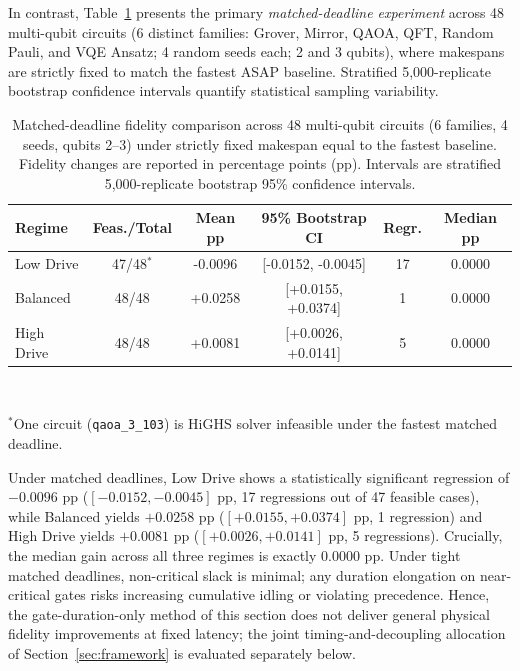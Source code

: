 \documentclass[10pt,letterpaper,journal]{IEEEtran}
\begin{document}
In contrast, Table~\ref{tab:matched_deadlines} presents the primary \emph{matched-deadline experiment} across 48 multi-qubit circuits (6 distinct families: Grover, Mirror, QAOA, QFT, Random Pauli, and VQE Ansatz; 4 random seeds each; 2 and 3 qubits), where makespans are strictly fixed to match the fastest ASAP baseline. Stratified 5,000-replicate bootstrap confidence intervals quantify statistical sampling variability.

\begin{table}[t]
\caption{Matched-deadline fidelity comparison across 48 multi-qubit circuits (6 families, 4 seeds, qubits 2--3) under strictly fixed makespan equal to the fastest baseline. Fidelity changes are reported in percentage points (pp). Intervals are stratified 5,000-replicate bootstrap 95\% confidence intervals.}\label{tab:matched_deadlines}
\centering\footnotesize\setlength{\tabcolsep}{1.8pt}
\begin{tabular}{lccccc}\toprule
Regime & Feas./Total & Mean pp & 95\% Bootstrap CI & Regr. & Median pp \\\midrule
Low Drive  & 47/48$^*$ & -0.0096 & [-0.0152, -0.0045] & 17 & 0.0000 \\
Balanced   & 48/48     & +0.0258 & [+0.0155, +0.0374] & 1  & 0.0000 \\
High Drive & 48/48     & +0.0081 & [+0.0026, +0.0141] & 5  & 0.0000 \\
\bottomrule
\end{tabular}\\[2pt]
\parbox{0.96\columnwidth}{\scriptsize $^*$One circuit (\texttt{qaoa\_3\_103}) is HiGHS solver infeasible under the fastest matched deadline.}
\end{table}

Under matched deadlines, Low Drive shows a statistically significant regression of $-0.0096$ pp ($[-0.0152, -0.0045]$ pp, 17 regressions out of 47 feasible cases), while Balanced yields $+0.0258$ pp ($[+0.0155, +0.0374]$ pp, 1 regression) and High Drive yields $+0.0081$ pp ($[+0.0026, +0.0141]$ pp, 5 regressions). Crucially, the median gain across all three regimes is exactly $0.0000$ pp. Under tight matched deadlines, non-critical slack is minimal; any duration elongation on near-critical gates risks increasing cumulative idling or violating precedence. Hence, the gate-duration-only method of this section does not deliver general physical fidelity improvements at fixed latency; the joint timing-and-decoupling allocation of Section~\ref{sec:framework} is evaluated separately below.
\end{document}
